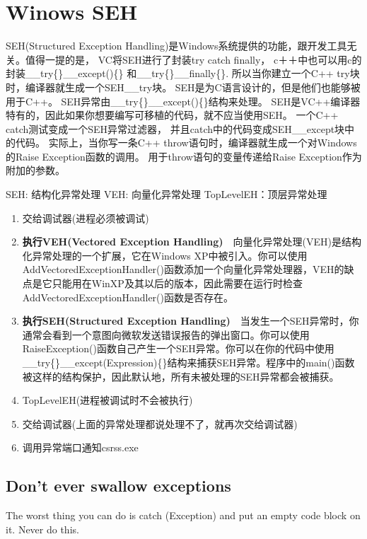 \documentclass{book}
\begin{document}
\section{Winows SEH}

SEH(Structured Exception Handling)是Windows系统提供的功能，跟开发工具无关。值得一提的是，
VC将SEH进行了封装try catch finally，
c＋＋中也可以用c的封装\_\_try\{\}\_\_except()\{\} 和\_\_try\{\}\_\_finally\{\}.
所以当你建立一个C++ try块时，编译器就生成一个SEH\_\_try块。
SEH是为C语言设计的，但是他们也能够被用于C++。
SEH异常由\_\_try\{\}\_\_except()\{\}结构来处理。
SEH是VC++编译器特有的，因此如果你想要编写可移植的代码，就不应当使用SEH。
一个C++ catch测试变成一个SEH异常过滤器，
并且catch中的代码变成SEH\_\_except块中的代码。
实际上，当你写一条C++ throw语句时，编译器就生成一个对Windows的Raise Exception函数的调用。
用于throw语句的变量传递给Raise Exception作为附加的参数。

SEH: 结构化异常处理
VEH: 向量化异常处理
TopLevelEH：顶层异常处理

\begin{enumerate}
\setcounter{enumi}{0}
\item{交给调试器(进程必须被调试)}
\item{\textbf{执行VEH(Vectored Exception Handling)}}~~向量化异常处理(VEH)是结构化异常处理的一个扩展，它在Windows XP中被引入。你可以使用AddVectoredExceptionHandler()函数添加一个向量化异常处理器，VEH的缺点是它只能用在WinXP及其以后的版本，因此需要在运行时检查AddVectoredExceptionHandler()函数是否存在。
\item{\textbf{执行SEH(Structured Exception Handling)}}~~当发生一个SEH异常时，你通常会看到一个意图向微软发送错误报告的弹出窗口。你可以使用RaiseException()函数自己产生一个SEH异常。你可以在你的代码中使用\_\_try\{\}\_\_except(Expression)\{\}结构来捕获SEH异常。程序中的main()函数被这样的结构保护，因此默认地，所有未被处理的SEH异常都会被捕获。
\item{TopLevelEH(进程被调试时不会被执行)}
\item{交给调试器(上面的异常处理都说处理不了，就再次交给调试器)}
\item{调用异常端口通知csrss.exe}
\end{enumerate}

\subsection{Don't ever swallow exceptions}

The worst thing you can do is catch (Exception) and put an empty code block on it. Never do this.
\end{document}
